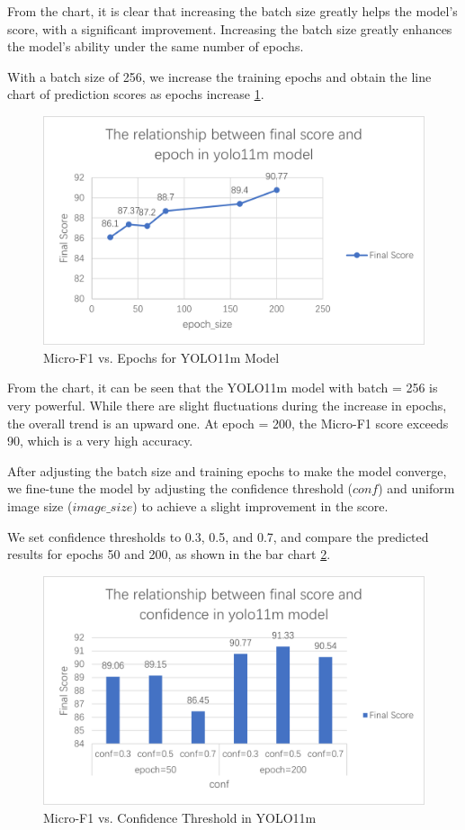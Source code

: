 From the chart, it is clear that increasing the batch size greatly helps the model's score, with a significant improvement. Increasing the batch size greatly enhances the model's ability under the same number of epochs.

With a batch size of 256, we increase the training epochs and obtain the line chart of prediction scores as epochs increase \cref{fig:yolo-epoch}.
\begin{figure}[t]
  \centering
  \includegraphics[width=0.8\linewidth]{./graphs/图片9.png}

  \caption{Micro-F1 vs. Epochs for YOLO11m Model}
  \label{fig:yolo-epoch}
\end{figure}

From the chart, it can be seen that the YOLO11m model with batch = 256 is very powerful. While there are slight fluctuations during the increase in epochs, the overall trend is an upward one. At epoch = 200, the Micro-F1 score exceeds 90, which is a very high accuracy.

After adjusting the batch size and training epochs to make the model converge, we fine-tune the model by adjusting the confidence threshold ($conf$) and uniform image size ($image\_size$) to achieve a slight improvement in the score.

We set confidence thresholds to 0.3, 0.5, and 0.7, and compare the predicted results for epochs 50 and 200, as shown in the bar chart \cref{fig:yolo-conf}.

\begin{figure}[t]
  \centering
  \includegraphics[width=0.8\linewidth]{./graphs/图片10.png}

  \caption{Micro-F1 vs. Confidence Threshold in YOLO11m}
  \label{fig:yolo-conf}
\end{figure}

